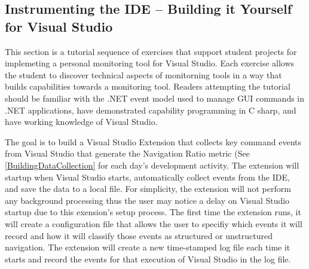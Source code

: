 
\subsection{Instrumenting the IDE -- Building it Yourself for Visual Studio} 
\label{buildItYourself}

This section is a tutorial sequence of exercises that support student projects for implemeting a personal monitoring tool for Visual Studio.  Each exercise allows the student to discover technical aspects of monitorning tools in a way that builds capabilities towards a monitoring tool.  Readers attempting the tutorial should be familiar with the .NET event model used to manage GUI commands in .NET applications, have demonstrated capability programming in C sharp, and have working knowledge of Visual Studio.  

The goal is to build a Visual Studio Extension that collects key command events from Visual Studio that generate the Navigation Ratio metric (See \ref{BuildingDataCollection} for each day's development activity.  The extension will startup when Visual Studio starts, automatically collect events from the IDE, and save the data to a local file.  For simplicity, the extension will not perform any background processing thus the user may notice a delay on Visual Studio startup due to this exension's setup process.  The first time the extension runs, it will create a configuration file that allows the user to specifiy which events it will record and how it will classify those events as structured or unstructured navigation.  The extension will create a new time-stamped log file each time it starts and record the events for that execution of Visual Studio in the log file. 


